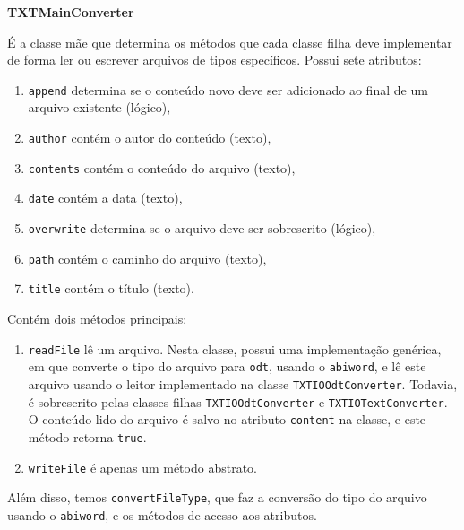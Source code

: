 \vspace{1em}
\textbf{TXTMainConverter}

É a classe mãe que determina os métodos que cada classe filha deve
implementar de forma ler ou escrever arquivos de tipos
específicos. Possui sete atributos:
\begin{enumerate}
\item \verb|append| determina se o conteúdo novo deve ser adicionado
  ao final de um arquivo existente (lógico),
\item \verb|author| contém o autor do conteúdo (texto),
\item \verb|contents| contém o conteúdo do arquivo (texto),
\item \verb|date| contém a data (texto),
\item \verb|overwrite| determina se o arquivo deve ser sobrescrito
  (lógico),
\item \verb|path| contém o caminho do arquivo (texto),
\item \verb|title| contém o título (texto).
\end{enumerate}

Contém dois métodos principais:
\begin{enumerate}
\item \verb|readFile| lê um arquivo. Nesta classe, possui uma
  implementação genérica, em que converte o tipo do arquivo para
  \verb|odt|, usando o \verb|abiword|, e lê este arquivo usando o
  leitor implementado na classe \verb|TXTIOOdtConverter|. Todavia, é
  sobrescrito pelas classes filhas \verb|TXTIOOdtConverter| e
  \verb|TXTIOTextConverter|. O conteúdo lido do arquivo é salvo no
  atributo \verb|content| na classe, e este método retorna
  \verb|true|.

\item \verb|writeFile| é apenas um método abstrato.
\end{enumerate}

Além disso, temos \verb|convertFileType|, que faz a conversão do tipo
do arquivo usando o \verb|abiword|, e os métodos de acesso aos
atributos.

